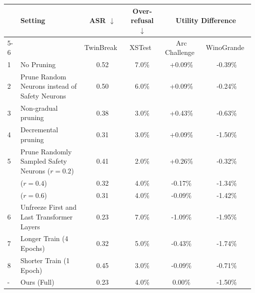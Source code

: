 \begin{table}[htbp]


    \begin{tabular}{ll cccc}
        \toprule
        & \multirow{2}{*}{\textbf{Setting}} & \textbf{ASR} $\downarrow$ & \textbf{Over-refusal} $\downarrow$ & \multicolumn{2}{c}{\textbf{Utility Difference}} \\
        \cmidrule(lr){5-6}
         & & \small TwinBreak~\cite{twinbreak} & \small XSTest~\cite{rottger2024xstest} & Arc Challenge~\cite{arc_challenge} & WinoGrande~\cite{WinoGrande} \\
        \midrule
        1 & No Pruning                                          & 0.52 & 7.0\% & +0.09\% & -0.39\% \\
        2 & Prune Random Neurons instead of Safety Neurons      & 0.50 & 6.0\% & +0.09\% & -0.24\% \\
        \midrule
        3 & Non-gradual pruning                                 & 0.38 & 3.0\% & +0.43\% & -0.63\% \\
        4 & Decremental pruning                                 & 0.31 & 3.0\% & +0.09\% & -1.50\% \\
        5 & Prune Randomly Sampled Safety Neurons ($r=0.2$)     & 0.41 & 2.0\% & +0.26\% & -0.32\% \\
          & \hspace{160pt}($r=0.4$)                             & 0.32 & 4.0\% & -0.17\% & -1.34\% \\
          & \hspace{160pt}($r=0.6$)                             & 0.31 & 4.0\% & -0.09\% & -1.42\% \\

        \midrule
        6 & Unfreeze First and Last Transformer Layers          & 0.23 & 7.0\% & -1.09\% & -1.95\% \\
        7 & Longer Train  (4 Epochs)                            & 0.32 & 5.0\% & -0.43\% & -1.74\% \\
        8 & Shorter Train (1 Epoch)                             & 0.45 & 3.0\% & -0.09\% & -0.71\% \\
                
        \midrule
        - & Ours (Full) & 0.23 & 4.0\% & 0.00\% & -1.50\% \\
        \bottomrule
    \end{tabular}
\end{table}